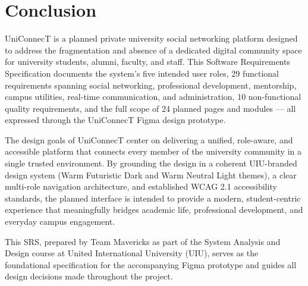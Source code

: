 \documentclass[12pt, a4paper]{article}
\begin{document}
\section{Conclusion}

UniConnecT is a planned private university social networking platform designed to
address the fragmentation and absence of a dedicated digital community space for
university students, alumni, faculty, and staff. This Software Requirements
Specification documents the system's five intended user roles, 29 functional
requirements spanning social networking, professional development, mentorship, campus
utilities, real-time communication, and administration, 10 non-functional quality
requirements, and the full scope of 24 planned pages and modules --- all expressed
through the UniConnecT Figma design prototype.

The design goals of UniConnecT center on delivering a unified, role-aware, and
accessible platform that connects every member of the university community in a single
trusted environment. By grounding the design in a coherent UIU-branded design system
(Warm Futuristic Dark and Warm Neutral Light themes), a clear multi-role navigation
architecture, and established WCAG 2.1 accessibility standards, the planned interface
is intended to provide a modern, student-centric experience that meaningfully bridges
academic life, professional development, and everyday campus engagement.

This SRS, prepared by Team Mavericks as part of the System Analysis and Design course
at United International University (UIU), serves as the foundational specification for
the accompanying Figma prototype and guides all design decisions made throughout the
project.

\end{document}
